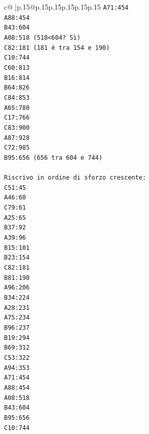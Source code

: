 \documentclass{article}
\begin{document}
{\begin{supertabular}{c@{$\;$}|p{.15\linewidth}@{}p{.15\linewidth}p{.15\linewidth}p{.15\linewidth}p{.15\linewidth}p{.15\linewidth}}
{{{\texttt{A71:454} \\
\texttt{A88:454} \\
\texttt{B43:604} \\
\texttt{A08:518 (518<604? Sì)} \\
\texttt{C82:181 (181 è tra 154 e 190)} \\
\texttt{C10:744} \\
\texttt{C60:813} \\
\texttt{B16:814} \\
\texttt{B64:826} \\
\texttt{C84:853} \\
\texttt{A65:780} \\
\texttt{C17:766} \\
\texttt{C83:900} \\
\texttt{A87:928} \\
\texttt{C72:985} \\
\texttt{B95:656 (656 tra 604 e 744)} \\
\\ 
\texttt{Riscrivo in ordine di sforzo crescente:} \\
\texttt{C51:45} \\
\texttt{A46:60} \\
\texttt{C79:61} \\
\texttt{A25:65} \\
\texttt{B37:92} \\
\texttt{A39:96} \\
\texttt{B15:101} \\
\texttt{B23:154} \\
\texttt{C82:181} \\
\texttt{B81:190} \\
\texttt{A96:206} \\
\texttt{B34:224} \\
\texttt{A28:231} \\
\texttt{A75:234} \\
\texttt{B96:237} \\
\texttt{B19:294} \\
\texttt{B69:312} \\
\texttt{C53:322} \\
\texttt{A94:353} \\
\texttt{A71:454} \\
\texttt{A88:454} \\
\texttt{A08:518} \\
\texttt{B43:604} \\
\texttt{B95:656} \\
\texttt{C10:744} \\
}}}
\end{supertabular}}
\end{document}
